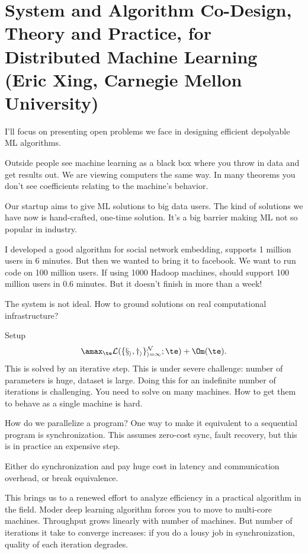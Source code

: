 \section{System and Algorithm Co-Design, Theory and Practice, for Distributed Machine Learning (Eric Xing, Carnegie Mellon University)}

I'll focus on presenting open problems we face in designing efficient depolyable ML algorithms. 

Outside people see machine learning as a black box where you throw in data and get results out. We are viewing computers the same way. 
In many theorems you don't see coefficients relating to the machine's behavior. 

Our startup aims to give ML solutions to big data users. The kind of solutions we have now is hand-crafted, one-time solution. It's a big barrier making ML not so popular in industry.

I developed a good algorithm for social network embedding, supports 1 million users in 6 minutes. But then we wanted to bring it to facebook. We want to run code on 100 million users. 
If using 1000 Hadoop machines, should support 100 million users in 0.6 minutes. But it doesn't finish in more than a week!

The system is not ideal. How to ground solutions on real computational infrastructure?

Setup
$$
\amax_{\te} \cal L (\{x_i,y_i\}_{i=1}^N ; \te) + \Om(\te). 
$$
This is solved by an iterative step. This is under severe challenge: number of parameters is huge, dataset is large. Doing this for an indefinite number of iterations is challenging. You need to solve on many machines. How to get them to behave as a single machine is hard. 

How do we parallelize a program? One way to make it equivalent to a sequential program is synchronization. This assumes zero-cost sync, fault recovery, but this is in practice an expensive step.  

Either do synchronization and pay huge cost in latency and communication overhead, or break equivalence. 

This brings us to a renewed effort to analyze efficiency in a practical algorithm in the field. %
Moder deep learning algorithm forces you to move to multi-core machines. Throughput grows linearly with number of machines. But number of iterations it take to converge increases: if you do a lousy job in synchronization, quality of each iteration degrades. 

